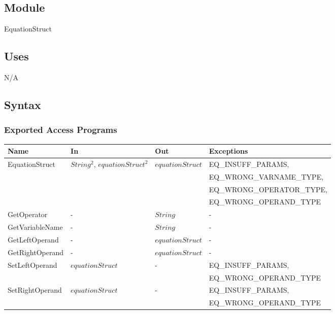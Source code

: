 \documentclass[12pt, titlepage]{article}
\begin{document}
\subsection{Module}

EquationStruct

\subsection{Uses}

N/A

\subsection{Syntax}

\subsubsection{Exported Access Programs}

\begin{center}
	\begin{tabular}{p{3cm} p{3cm} p{3cm} p{5cm}}
		\hline
		\textbf{Name} & \textbf{In} & \textbf{Out} & \textbf{Exceptions} \\
		\hline
		\multirow{4}{3cm}{EquationStruct} & \multirow{4}{3cm}{$String^2$, 
		$equationStruct^2$} & \multirow{4}{3cm}{$equationStruct$} & 
		EQ\_INSUFF\_PARAMS,\\
		&  & & EQ\_WRONG\_VARNAME\_TYPE,\\
		&  & & EQ\_WRONG\_OPERATOR\_TYPE,\\
		& & & EQ\_WRONG\_OPERAND\_TYPE\\
		GetOperator & - & $String$ & - \\
		GetVariableName & - & $String$ & - \\
		GetLeftOperand & - & $equationStruct$ & -\\
		GetRightOperand & - & $equationStruct$ & - \\
		\multirow{2}{3cm}{SetLeftOperand} & \multirow{2}{3cm}{$equationStruct$} 
		& \multirow{2}{3cm}{-} & EQ\_INSUFF\_PARAMS,\\
		& & & EQ\_WRONG\_OPERAND\_TYPE\\
		\multirow{2}{3cm}{SetRightOperand} & 
		\multirow{2}{3cm}{$equationStruct$} & \multirow{2}{3cm}{-} & 
		EQ\_INSUFF\_PARAMS,\\
		& & & EQ\_WRONG\_OPERAND\_TYPE\\
		\hline
	\end{tabular}
\end{center}
\end{document}
